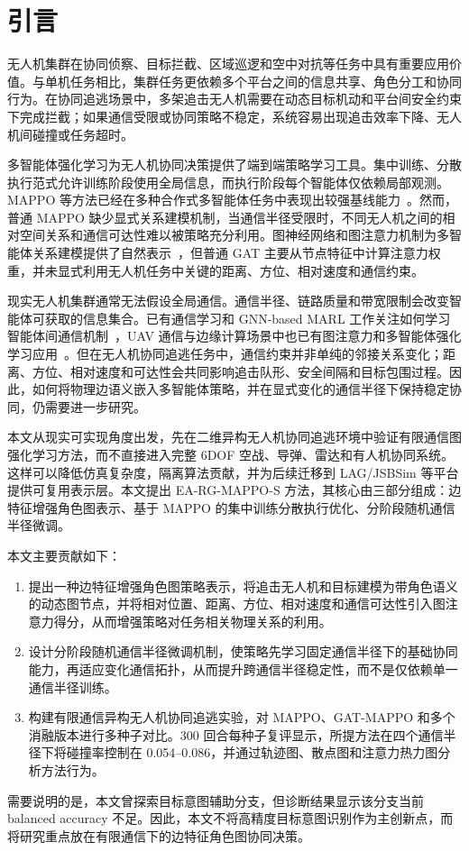 \section{引言}

无人机集群在协同侦察、目标拦截、区域巡逻和空中对抗等任务中具有重要应用价值。与单机任务相比，集群任务更依赖多个平台之间的信息共享、角色分工和协同行为。在协同追逃场景中，多架追击无人机需要在动态目标机动和平台间安全约束下完成拦截；如果通信受限或协同策略不稳定，系统容易出现追击效率下降、无人机间碰撞或任务超时。

多智能体强化学习为无人机协同决策提供了端到端策略学习工具。集中训练、分散执行范式允许训练阶段使用全局信息，而执行阶段每个智能体仅依赖局部观测。MAPPO 等方法已经在多种合作式多智能体任务中表现出较强基线能力~\cite{yu2021mappo}。然而，普通 MAPPO 缺少显式关系建模机制，当通信半径受限时，不同无人机之间的相对空间关系和通信可达性难以被策略充分利用。图神经网络和图注意力机制为多智能体关系建模提供了自然表示~\cite{velickovic2017gat,malysheva2020magnet,liu2024gnn_marl}，但普通 GAT 主要从节点特征中计算注意力权重，并未显式利用无人机任务中关键的距离、方位、相对速度和通信约束。

现实无人机集群通常无法假设全局通信。通信半径、链路质量和带宽限制会改变智能体可获取的信息集合。已有通信学习和 GNN-based MARL 工作关注如何学习智能体间通信机制~\cite{singh2018ic3net,cuzin2026gnn_comm_survey}，UAV 通信与边缘计算场景中也已有图注意力和多智能体强化学习应用~\cite{feng2024gat_uav_comm,kim2024uav_mec_madrl}。但在无人机协同追逃任务中，通信约束并非单纯的邻接关系变化；距离、方位、相对速度和可达性会共同影响追击队形、安全间隔和目标包围过程。因此，如何将物理边语义嵌入多智能体策略，并在显式变化的通信半径下保持稳定协同，仍需要进一步研究。

本文从现实可实现角度出发，先在二维异构无人机协同追逃环境中验证有限通信图强化学习方法，而不直接进入完整 6DOF 空战、导弹、雷达和有人机协同系统。这样可以降低仿真复杂度，隔离算法贡献，并为后续迁移到 LAG/JSBSim 等平台提供可复用表示层。本文提出 EA-RG-MAPPO-S 方法，其核心由三部分组成：边特征增强角色图表示、基于 MAPPO 的集中训练分散执行优化、分阶段随机通信半径微调。

本文主要贡献如下：
\begin{enumerate}
    \item 提出一种边特征增强角色图策略表示，将追击无人机和目标建模为带角色语义的动态图节点，并将相对位置、距离、方位、相对速度和通信可达性引入图注意力得分，从而增强策略对任务相关物理关系的利用。
    \item 设计分阶段随机通信半径微调机制，使策略先学习固定通信半径下的基础协同能力，再适应变化通信拓扑，从而提升跨通信半径稳定性，而不是仅依赖单一通信半径训练。
    \item 构建有限通信异构无人机协同追逃实验，对 MAPPO、GAT-MAPPO 和多个消融版本进行多种子对比。300 回合每种子复评显示，所提方法在四个通信半径下将碰撞率控制在 0.054--0.086，并通过轨迹图、散点图和注意力热力图分析方法行为。
\end{enumerate}

需要说明的是，本文曾探索目标意图辅助分支，但诊断结果显示该分支当前 balanced accuracy 不足。因此，本文不将高精度目标意图识别作为主创新点，而将研究重点放在有限通信下的边特征角色图协同决策。
